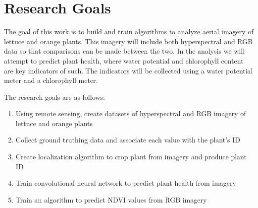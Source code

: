 \chapter{Research Goals}

The goal of this work is to build and train algorithms to analyze aerial imagery of lettuce and orange plants. This imagery will include both hyperspectral and RGB data so that comparisons can be made between the two. In the analysis we will attempt to predict plant health, where water potential and chlorophyll content are key indicators of such. The indicators will be collected using a water potential meter and a chlorophyll meter. 

The research goals are as follows:
\begin{enumerate}
    \item Using remote sensing, create datasets of hyperspectral and RGB imagery of lettuce and orange plants
    \item Collect ground truthing data and associate each value with the plant's ID
    \item Create localization algorithm to crop plant from imagery and produce plant ID
    \item Train convolutional neural network to predict plant health from imagery
    \item Train an algorithm to predict NDVI values from RGB imagery
\end{enumerate}